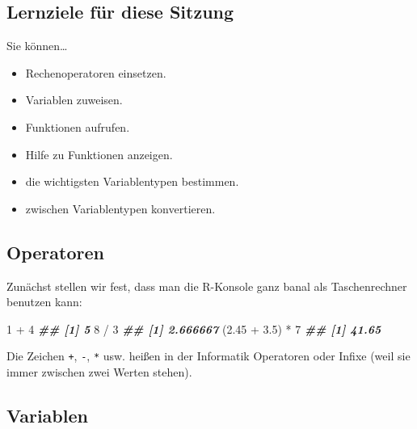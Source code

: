 \documentclass[11pt,german,a4paper]{article}
\newenvironment{Shaded}{\begin{snugshade}}{\end{snugshade}}
\newcommand{\DecValTok}[1]{\textcolor[rgb]{0.00,0.00,0.81}{#1}}
\newcommand{\DocumentationTok}[1]{\textcolor[rgb]{0.56,0.35,0.01}{\textbf{\textit{#1}}}}
\newcommand{\FloatTok}[1]{\textcolor[rgb]{0.00,0.00,0.81}{#1}}
\newcommand{\NormalTok}[1]{#1}
\newcommand{\SpecialCharTok}[1]{\textcolor[rgb]{0.00,0.00,0.00}{#1}}
\providecommand{\tightlist}{%
  \setlength{\itemsep}{0pt}\setlength{\parskip}{0pt}}
\begin{document}
\hypertarget{lernziele-fuxfcr-diese-sitzung}{%
\subsection*{Lernziele für diese Sitzung}\label{lernziele-fuxfcr-diese-sitzung}}

Sie können\ldots{}

\begin{itemize}
\tightlist
\item
  Rechenoperatoren einsetzen.
\item
  Variablen zuweisen.
\item
  Funktionen aufrufen.
\item
  Hilfe zu Funktionen anzeigen.
\item
  die wichtigsten Variablentypen bestimmen.
\item
  zwischen Variablentypen konvertieren.
\end{itemize}

\hypertarget{operatoren}{%
\subsection*{Operatoren}\label{operatoren}}

Zunächst stellen wir fest, dass man die R-Konsole ganz banal als Taschenrechner benutzen kann:

\begin{Shaded}
\begin{Highlighting}[]
\DecValTok{1} \SpecialCharTok{+} \DecValTok{4}
\DocumentationTok{\#\# [1] 5}
\DecValTok{8} \SpecialCharTok{/} \DecValTok{3}
\DocumentationTok{\#\# [1] 2.666667}
\NormalTok{(}\FloatTok{2.45} \SpecialCharTok{+} \FloatTok{3.5}\NormalTok{) }\SpecialCharTok{*} \DecValTok{7}
\DocumentationTok{\#\# [1] 41.65}
\end{Highlighting}
\end{Shaded}

Die Zeichen \texttt{+}, \texttt{-}, \texttt{*} usw. heißen in der Informatik Operatoren oder Infixe (weil sie immer zwischen zwei Werten stehen).

\hypertarget{variablen}{%
\subsection*{Variablen}\label{variablen}}
\end{document}
